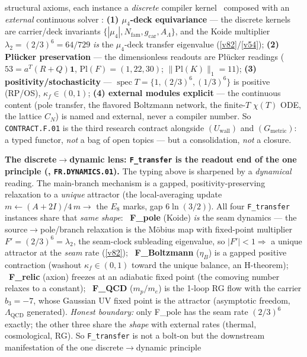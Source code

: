 \documentclass[11pt,a4paper]{article}
\newcommand{\Nfam}{N_{\mathrm{fam}}}
\newcommand{\gcar}{g_{\mathrm{car}}}
\begin{document}
structural axioms, each instance a \emph{discrete} compiler kernel \mE\ composed with an \emph{external}
continuous solver \mC: \textbf{(1) $\mu_4$-deck equivariance} --- the discrete kernels are carrier/deck
invariants $\{|\mu_4|,\Nfam,\gcar,A_\Lambda\}$, and the Koide multiplier $\lambda_2{=}(2/3)^6{=}64/729$
\emph{is} the $\mu_4$-deck transfer eigenvalue (\vref{v82}/\vref{v54}); \textbf{(2) Pl\"ucker preservation}
--- the dimensionless readouts are Pl\"ucker readings ($53{=}a^T(R{+}Q)\mathbf1$, $\mathrm{Pl}(F){=}(1,22,30)$;
$\|\mathrm{Pl}(K)\|_1{=}11$); \textbf{(3) positivity/stochasticity} --- $\operatorname{spec}T{=}\{1,(2/3)^6,(1/3)^6\}$
is positive (RP/OS), $\kappa_f{\in}(0,1)$; \textbf{(4) external modules explicit} --- the continuous content
(pole transfer, the flavored Boltzmann network, the finite-$T$ $\chi(T)$ ODE, the lattice $C_N$) is named and
external, never a compiler number. So \texttt{CONTRACT.F.01} is the third research contract alongside
$(U_{\mathrm{wall}})$ and $(G_{\mathrm{metric}})$: a typed functor, \emph{not} a bag of open topics --- but a
consolidation, \emph{not} a closure.
\par\smallskip\noindent\textbf{The discrete$\to$dynamic lens: \texttt{F\_transfer} is the readout end of the one
principle (, \texttt{FR.DYNAMICS.01}).} The typing above is sharpened by a
\emph{dynamical} reading. The main-branch mechanism is a gapped, positivity-preserving relaxation to a
\emph{unique} attractor (the local-averaging update $m\!\leftarrow\!(A{+}2I)/4\,m\to$ the $E_8$ marks, gap
$6\ln(3/2)$). All four \texttt{F\_transfer} instances share that \emph{same shape}: \mE\ \textbf{F\_pole} (Koide)
\emph{is} the seam dynamics --- the source$\to$pole/branch relaxation is the M\"obius map with fixed-point
multiplier $F'{=}(2/3)^6{=}\lambda_2$, the seam-clock subleading eigenvalue, so $|F'|<1\Rightarrow$ a unique
attractor at the \emph{seam} rate (\vref{v82}); \mC\ \textbf{F\_Boltzmann} ($\eta_B$) is a gapped positive
contraction (washout $\kappa_f\in(0,1)$ toward the unique balance, an H-theorem); \mC\ \textbf{F\_relic} (axion)
freezes at an adiabatic fixed point (the comoving number relaxes to a constant); \mE\ \textbf{F\_QCD} ($m_p/m_e$)
is the 1-loop RG flow with the carrier $b_3{=}-7$, whose Gaussian UV fixed point is the attractor (asymptotic
freedom, $\Lambda_{\mathrm{QCD}}$ generated). \emph{Honest boundary:} only F\_pole has the seam rate $(2/3)^6$
exactly; the other three share the \emph{shape} with external rates (thermal, cosmological, RG). So
\texttt{F\_transfer} is not a bolt-on but the downstream manifestation of the one discrete$\to$dynamic principle
\end{document}
